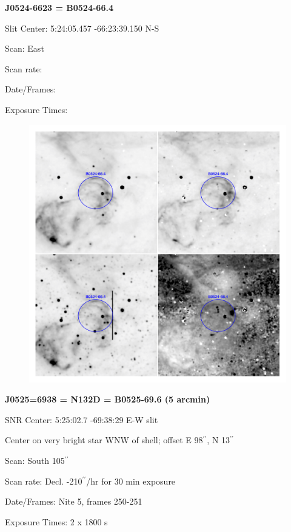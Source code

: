 \documentclass[11pt]{article}
\newcommand{\arcsec}{$^{\prime\prime}$}
\begin{document}
\newpage
{\bf J0524-6623 = B0524-66.4}  
 
Slit Center:   5:24:05.457   -66:23:39.150 N-S

Scan:  East

Scan rate:  

Date/Frames:

Exposure Times:  

\begin{figure}
\includegraphics[width=11.cm]{snapshots/B0524-664.png}
\end{figure}


\newpage
{\bf J0525=6938 = N132D = B0525-69.6 (5 arcmin)}  
 
SNR Center:   5:25:02.7   -69:38:29     E-W slit

Center on very bright star WNW of shell; offset E 98\arcsec,  N 13\arcsec

Scan:  South  105\arcsec

Scan rate:  Decl. -210\arcsec/hr  for 30 min exposure

Date/Frames:  Nite 5, frames 250-251

Exposure Times:  2 x 1800 s
\end{document}
